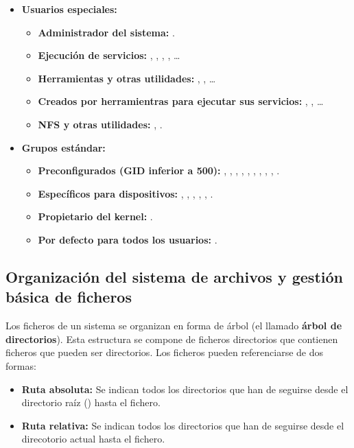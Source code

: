 \begin{itemize}
	\item\textbf{Usuarios especiales:}
	\begin{itemize}
		\item\textbf{Administrador del sistema:} .
		\item\textbf{Ejecución de servicios:} , , , , \ldots
		\item\textbf{Herramientas y otras utilidades:} , , \ldots
		\item\textbf{Creados por herramientras para ejecutar sus servicios:} , , \ldots
		\item\textbf{NFS y otras utilidades:} , .
	\end{itemize}
	\item\textbf{Grupos estándar:}
	\begin{itemize}
		\item\textbf{Preconfigurados (GID inferior a 500):} , , , , , , , , , .
		\item\textbf{Específicos para dispositivos:} , , , , , .
		\item\textbf{Propietario del kernel:} .
		\item\textbf{Por defecto para todos los usuarios:} .
	\end{itemize}
\end{itemize}

\subsection{Organización del sistema de archivos y gestión básica de ficheros}

Los ficheros de un sistema se organizan en forma de árbol (el llamado \textbf{árbol de directorios}).
Esta estructura se compone de ficheros directorios que contienen ficheros que pueden ser directorios.
Los ficheros pueden referenciarse de dos formas:

\begin{itemize}
	\item\textbf{Ruta absoluta:} Se indican todos los directorios que han de seguirse desde el directorio raíz (\code{/}) hasta el fichero.
	\item\textbf{Ruta relativa:} Se indican todos los directorios que han de seguirse desde el direcotorio actual hasta el fichero.
\end{itemize}

